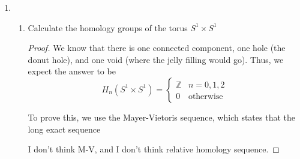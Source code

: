 \documentclass{article}
\begin{document}
\begin{enumerate}
	\item \begin{enumerate} 
		\item Calculate the homology groups of the torus $S^1 \times S^1$
		\begin{proof}
			We know that there is one connected component, one hole (the donut hole), and one void (where the jelly filling would go). Thus, we expect the answer to be 
			\[H_n(S^1\times S^1) = \begin{cases} \mathbb{Z} & n = 0,1,2 \\ 0 & \text{otherwise} \end{cases}\]
			
			To prove this, we use the Mayer-Vietoris sequence, which states that the long exact sequence 
			
			I don't think M-V, and I don't think relative homology sequence.
		\end{proof}
		
		\end{enumerate}
\end{enumerate}
\end{document}
